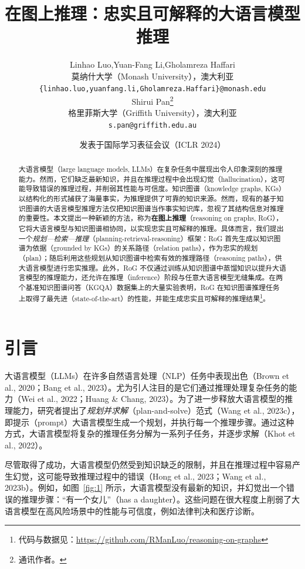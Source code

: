 \documentclass[11pt,UTF8,fontset=fandol]{ctexart}
\title{\textbf{在图上推理：忠实且可解释的大语言模型推理}}
\author{Linhao Luo,\quad Yuan-Fang Li,\quad Gholamreza Haffari\\
莫纳什大学（Monash University），澳大利亚\\
\texttt{\{linhao.luo,yuanfang.li,Gholamreza.Haffari\}@monash.edu}\\[0.6em]
Shirui Pan\thanks{通讯作者。}\\
格里菲斯大学（Griffith University），澳大利亚\\
\texttt{s.pan@griffith.edu.au}}
\date{发表于国际学习表征会议（ICLR 2024）}
\begin{document}
\maketitle

\begin{abstract}
大语言模型（large language models, LLMs）在复杂任务中展现出令人印象深刻的推理能力。然而，它们缺乏最新知识，并且在推理过程中会出现幻觉（hallucination），这可能导致错误的推理过程，并削弱其性能与可信度。知识图谱（knowledge graphs, KGs）以结构化的形式捕获了海量事实，为推理提供了可靠的知识来源。然而，现有的基于知识图谱的大语言模型推理方法仅把知识图谱当作事实知识库，忽视了其结构信息对推理的重要性。本文提出一种新颖的方法，称为\textbf{在图上推理}（reasoning on graphs, RoG），它将大语言模型与知识图谱相协同，以实现忠实且可解释的推理。具体而言，我们提出一个\emph{规划—检索—推理}（planning-retrieval-reasoning）框架：RoG 首先生成以知识图谱为依据（grounded by KGs）的关系路径（relation paths），作为忠实的规划（plan）；随后利用这些规划从知识图谱中检索有效的推理路径（reasoning paths），供大语言模型进行忠实推理。此外，RoG 不仅通过训练从知识图谱中蒸馏知识以提升大语言模型的推理能力，还允许在推理（inference）阶段与任意大语言模型无缝集成。在两个基准知识图谱问答（KGQA）数据集上的大量实验表明，RoG 在知识图谱推理任务上取得了最先进（state-of-the-art）的性能，并能生成忠实且可解释的推理结果\footnote{代码与数据见：\url{https://github.com/RManLuo/reasoning-on-graphs}}。
\end{abstract}

\section{引言}

大语言模型（LLMs）在许多自然语言处理（NLP）任务中表现出色（Brown et al., 2020；Bang et al., 2023）。尤为引人注目的是它们通过推理处理复杂任务的能力（Wei et al., 2022；Huang \& Chang, 2023）。为了进一步释放大语言模型的推理能力，研究者提出了\emph{规划并求解}（plan-and-solve）范式（Wang et al., 2023c），即提示（prompt）大语言模型生成一个规划，并执行每一个推理步骤。通过这种方式，大语言模型将复杂的推理任务分解为一系列子任务，并逐步求解（Khot et al., 2022）。

尽管取得了成功，大语言模型仍然受到知识缺乏的限制，并且在推理过程中容易产生幻觉，这可能导致推理过程中的错误（Hong et al., 2023；Wang et al., 2023b）。例如，如图~\ref{fig:1} 所示，大语言模型没有最新的知识，并幻觉出一个错误的推理步骤：“有一个女儿”（has a daughter）。这些问题在很大程度上削弱了大语言模型在高风险场景中的性能与可信度，例如法律判决和医疗诊断。
\end{document}
